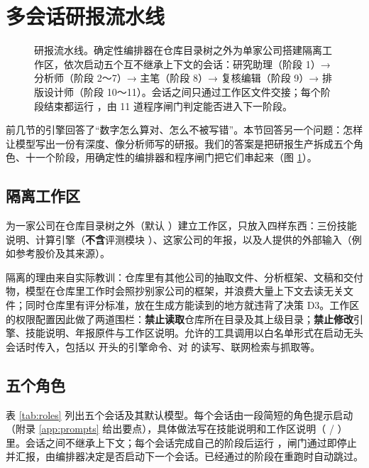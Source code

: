 \section{多会话研报流水线}
\label{sec:pipeline}

\begin{figure}[t]
  \centering
  \caption{研报流水线。确定性编排器在仓库目录树之外为单家公司搭建隔离工作区，依次启动五个互不继承上下文的会话：研究助理（阶段 1）→ 分析师（阶段 2～7）→ 主笔（阶段 8）→ 复核编辑（阶段 9）→ 排版设计师（阶段 10～11）。会话之间只通过工作区文件交接；每个阶段结束都运行 ，由 11 道程序闸门判定能否进入下一阶段。}
  \label{fig:pipeline}
\end{figure}

前几节的引擎回答了“数字怎么算对、怎么不被写错”。本节回答另一个问题：怎样让模型写出一份有深度、像分析师写的研报。我们的答案是把研报生产拆成五个角色、十一个阶段，用确定性的编排器和程序闸门把它们串起来（图 \ref{fig:pipeline}）。

\subsection{隔离工作区}
 为一家公司在仓库目录树之外（默认 ）建立工作区，只放入四样东西：三份技能说明、计算引擎（\textbf{不含}评测模块 ）、这家公司的年报，以及人提供的外部输入（例如参考股价及其来源）。

隔离的理由来自实际教训：仓库里有其他公司的抽取文件、分析框架、文稿和交付物，模型在仓库里工作时会照抄别家公司的框架，并浪费大量上下文去读无关文件；同时仓库里有评分标准，放在生成方能读到的地方就违背了决策 D3。工作区的权限配置因此做了两道围栏：\textbf{禁止读取}仓库所在目录及其上级目录；\textbf{禁止修改}引擎、技能说明、年报原件与工作区说明。允许的工具调用以白名单形式在启动无头会话时传入，包括以  开头的引擎命令、对  的读写、联网检索与抓取等。

\subsection{五个角色}
表 \ref{tab:roles} 列出五个会话及其默认模型。每个会话由一段简短的角色提示启动（附录 \ref{app:prompts} 给出要点），具体做法写在技能说明和工作区说明（ / ）里。会话之间不继承上下文；每个会话完成自己的阶段后运行 ，闸门通过即停止并汇报，由编排器决定是否启动下一个会话。已经通过的阶段在重跑时自动跳过。

